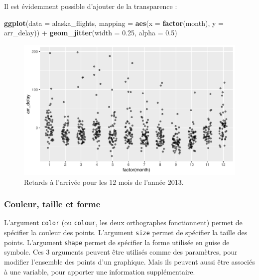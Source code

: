 \documentclass[
  a4paper,
]{article}
\newenvironment{Shaded}{\begin{snugshade}}{\end{snugshade}}
\newcommand{\DataTypeTok}[1]{\textcolor[rgb]{0.00,0.34,0.68}{#1}}
\newcommand{\FloatTok}[1]{\textcolor[rgb]{0.69,0.50,0.00}{#1}}
\newcommand{\KeywordTok}[1]{\textcolor[rgb]{0.12,0.11,0.11}{\textbf{#1}}}
\newcommand{\NormalTok}[1]{\textcolor[rgb]{0.12,0.11,0.11}{#1}}
\newcommand{\OperatorTok}[1]{\textcolor[rgb]{0.12,0.11,0.11}{#1}}
\newcommand{\StringTok}[1]{\textcolor[rgb]{0.75,0.01,0.01}{#1}}
\begin{document}
Il est évidemment possible d'ajouter de la transparence :

\begin{Shaded}
\begin{Highlighting}[]
\KeywordTok{ggplot}\NormalTok{(}\DataTypeTok{data =}\NormalTok{ alaska_flights, }
       \DataTypeTok{mapping =} \KeywordTok{aes}\NormalTok{(}\DataTypeTok{x =} \KeywordTok{factor}\NormalTok{(month), }\DataTypeTok{y =}\NormalTok{ arr_delay)) }\OperatorTok{+}
\StringTok{  }\KeywordTok{geom_jitter}\NormalTok{(}\DataTypeTok{width =} \FloatTok{0.25}\NormalTok{, }\DataTypeTok{alpha =} \FloatTok{0.5}\NormalTok{)}
\end{Highlighting}
\end{Shaded}

\begin{figure}[htpb]

{\centering \includegraphics[width=0.9\linewidth]{figure/unnamed-chunk-42-1} 

}

\caption{Retards à l'arrivée pour les 12 mois de l'année 2013.}\label{fig:unnamed-chunk-42}
\end{figure}

\hypertarget{couleur-taille-et-forme}{%
\subsubsection{Couleur, taille et forme}\label{couleur-taille-et-forme}}

L'argument \texttt{color} (ou \texttt{colour}, les deux orthographes fonctionnent) permet de spécifier la couleur des points. L'argument \texttt{size} permet de spécifier la taille des points. L'argument \texttt{shape} permet de spécifier la forme utilisée en guise de symbole. Ces 3 arguments peuvent être utilisés comme des paramètres, pour modifier l'ensemble des points d'un graphique. Mais ils peuvent aussi être associés à une variable, pour apporter une information supplémentaire.
\end{document}
